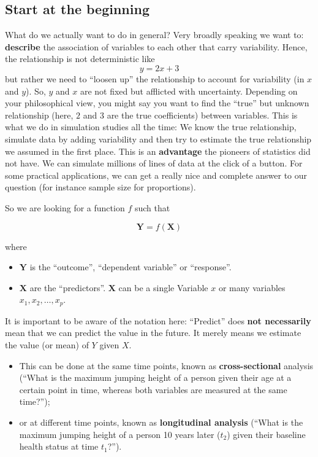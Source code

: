 \documentclass[
]{book}
\providecommand{\tightlist}{%
  \setlength{\itemsep}{0pt}\setlength{\parskip}{0pt}}
\begin{document}
\subsection{Start at the beginning}\label{start-at-the-beginning}

What do we actually want to do in general? Very broadly speaking we want to:
\textbf{describe} the association of variables to each other that carry variability.
Hence, the relationship is not deterministic like \[y = 2x + 3\] but rather we need
to ``loosen up'' the relationship to account for variability (in \(x\) and \(y\)).
So, \(y\) and \(x\) are not fixed but afflicted with uncertainty.
Depending on your philosophical view, you might say you want to find
the ``true'' but unknown relationship (here, \(2\) and \(3\) are the true coefficients) between variables.
This is what we do in simulation studies all the time: We know the true relationship,
simulate data by adding variability and then try to estimate the true relationship we assumed in the first place.
This is an \textbf{advantage} the pioneers of statistics did not have. We can simulate
millions of lines of data at the click of a button.
For some practical applications, we can get a really nice and complete answer to our question
(for instance sample size for proportions).

So we are looking for a function \(f\) such that

\[ \mathbf{Y} = f(\mathbf{X}) \]

where

\begin{itemize}
\tightlist
\item
  \(\mathbf{Y}\) is the ``outcome'', ``dependent variable'' or ``response''.
\item
  \(\mathbf{X}\) are the ``predictors''. \(\mathbf{X}\) can be a single Variable \(x\) or many
  variables \(x_1, x_2, \ldots, x_p\).
\end{itemize}

It is important to be aware of the notation here:
``Predict'' does \textbf{not necessarily} mean that we can predict the value in
the future. It merely means we estimate the value (or mean) of \(Y\) given \(X\).

\begin{itemize}
\tightlist
\item
  This can be done at the same time points, known as \textbf{cross-sectional} analysis (``What is the maximum jumping height
  of a person given their age at a certain point in time, whereas both variables are measured at the same time?'');
\item
  or at different time points, known as \textbf{longitudinal analysis} (``What is the maximum jumping height of a person 10 years later (\(t_2\))
  given their baseline health status at time \(t_1\)?'').
\end{itemize}
\end{document}
